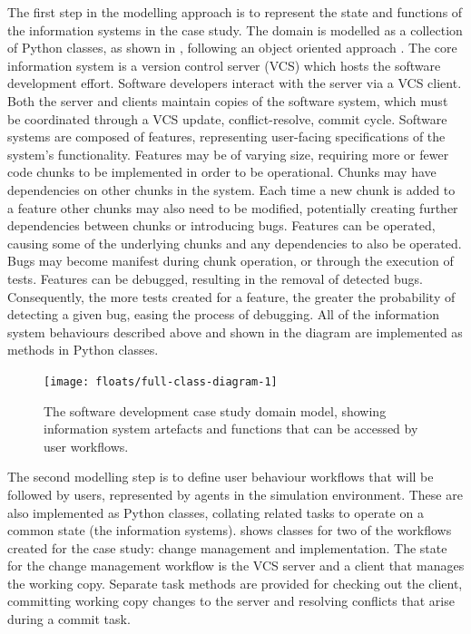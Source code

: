 \documentclass{llncs}
\begin{document}
The first step in the modelling approach is to represent the state and functions of the information systems in the case
study. The domain is modelled as a collection of Python classes, as shown in , following an object oriented approach
\cite{omg07omguml}.  
 The core information system is a version control server (VCS) which hosts the software development effort.  Software developers interact with the
server via a VCS client.  Both the server and clients maintain copies of the software system, which must be coordinated
through a VCS update, conflict-resolve, commit cycle.  Software systems are composed of features, representing
user-facing specifications of the system's functionality.  Features may be of varying size, requiring more or fewer code
chunks to be implemented in order to be operational.  Chunks may have dependencies on other chunks in the system.  Each
time a new chunk is added to a feature other chunks may also need to be modified, potentially creating further
dependencies between chunks or introducing bugs.  Features can be operated, causing some of the underlying chunks and
any dependencies to also be operated.  Bugs may become manifest during chunk operation, or through the execution of
tests.  Features can be debugged, resulting in the removal of detected bugs.  Consequently, the more tests created for a
feature, the greater the probability of detecting a given bug, easing the process of debugging. All of the information
system behaviours described above and shown in the diagram are implemented as methods in Python classes.

\begin{figure}[t]
  \centering
  \texttt{[image: floats/full-class-diagram-1]}
  \caption{The software development case study domain model, showing information system artefacts and functions that can
    be accessed by user workflows.}
  \label{fig:domain}

\end{figure}

The second modelling step is to define user behaviour workflows that will be followed by users, represented by agents in
the simulation environment. These are also implemented as Python classes, collating related tasks to operate on a common
state (the information systems).  shows classes for two of the workflows created for the case study:
change management and implementation.  The state for the change management workflow is the VCS server and a client that
manages the working copy.  Separate task methods are provided for checking out the client, committing working copy
changes to the server and resolving conflicts that arise during a commit task.
\end{document}
